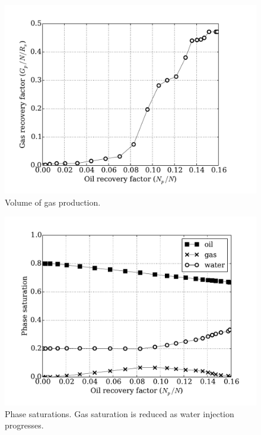 \documentclass[authoryear,preprint,review,11pt]{elsarticle}
\begin{document}
\begin{figure}
\centering
\includegraphics[width=\linewidth]{./python/matbal_gas}
\caption{Volume of gas production.}
\label{fig: matbal_gas}
\end{figure}

\begin{figure}
\centering
\includegraphics[width=\linewidth]{./python/matbal_S}
\caption{Phase saturations. Gas saturation is reduced as water injection progresses.}
\label{fig: matbal_s}
\end{figure}
\end{document}
